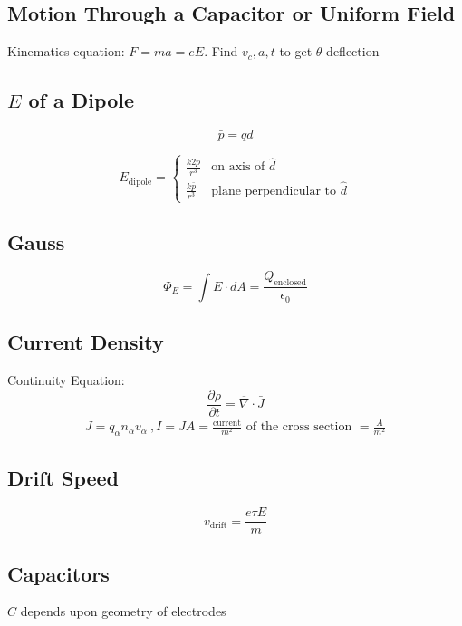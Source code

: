 \documentclass[10pt,letter]{article}
\begin{document}
\subsection{Motion Through a Capacitor or Uniform Field}
Kinematics equation: $F = ma = eE$. Find $v_c,a,t$ to get $\theta$ deflection

\subsection{$E$ of a Dipole}
\begin{equation}
 \bar{p} = qd 
\end{equation}

\[
 E_{\textrm{dipole}} =
  \begin{cases}
   \frac{k2\bar{p}}{r^3} & \textrm{on axis of }\hat{d} \\
   \frac{k\bar{p}}{r^3} & \textrm{plane perpendicular to }\hat{d}
  \end{cases}
\]

\subsection{Gauss}
\begin{equation}
 \Phi_E = \int E \cdot dA = \frac{Q_{\textrm{enclosed}}}{\epsilon_0}
\end{equation}

\subsection{Current Density}
Continuity Equation:
\begin{equation}
 \frac{\partial \rho}{\partial t} = \overline{\nabla} \cdot \bar{J}
\end{equation}
\begin{align}
 J = q_\alpha n_\alpha v_\alpha~, I = JA = \frac{\textrm{current}}{m^2} \textrm{ of the cross section }= \frac{A}{m^2}
\end{align}

\subsection{Drift Speed}
\begin{equation}
 v_{\textrm{drift}} = \frac{e \tau E}{m}
\end{equation}

\subsection{Capacitors}
$C$ depends upon geometry of electrodes
\end{document}
